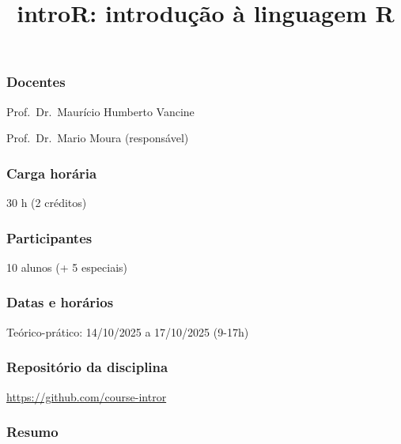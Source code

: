 \documentclass[
  letterpaper,
  DIV=11,
  numbers=noendperiod]{scrartcl}
\title{introR: introdução à linguagem R}
\author{}
\date{}
\begin{document}
\maketitle


\subsubsection{Docentes}\label{docentes}

Prof.~Dr.~Maurício Humberto Vancine

Prof.~Dr.~Mario Moura (responsável)

\subsubsection{Carga horária}\label{carga-horuxe1ria}

30 h (2 créditos)

\subsubsection{Participantes}\label{participantes}

10 alunos (+ 5 especiais)

\subsubsection{Datas e horários}\label{datas-e-horuxe1rios}

Teórico-prático: 14/10/2025 a 17/10/2025 (9-17h)

\subsubsection{Repositório da
disciplina}\label{reposituxf3rio-da-disciplina}

\url{https://github.com/course-intror}

\subsubsection{Resumo}\label{resumo}
\end{document}

